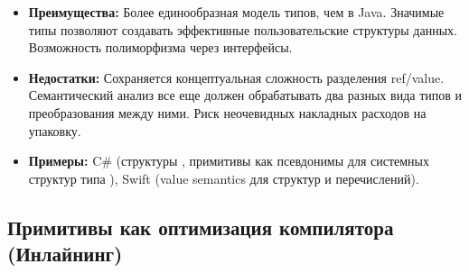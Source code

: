 \begin{itemize}[leftmargin=*, label={--}]
    \item \textbf{Преимущества:} Более единообразная модель типов, чем в Java. Значимые типы позволяют создавать эффективные пользовательские структуры данных. Возможность полиморфизма через интерфейсы.

    \item \textbf{Недостатки:} Сохраняется концептуальная сложность разделения ref/value. Семантический анализ все еще должен обрабатывать два разных вида типов и преобразования между ними. Риск неочевидных накладных расходов на упаковку.

    \item \textbf{Примеры:} C\# (структуры , примитивы как псевдонимы для системных структур типа ), Swift (value semantics для структур и перечислений).
\end{itemize}


\subsection{Примитивы как оптимизация компилятора (Инлайнинг)}

